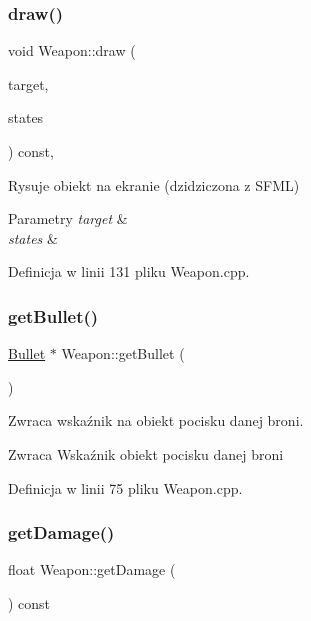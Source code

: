 \subsubsection{\texorpdfstring{draw()}{draw()}}
{\footnotesize\ttfamily void Weapon\+::draw (\begin{DoxyParamCaption}\item[{sf\+::\+Render\+Target \&}]{target,  }\item[{sf\+::\+Render\+States}]{states }\end{DoxyParamCaption}) const\hspace{0.3cm}{\ttfamily [override]}, {\ttfamily [protected]}}



Rysuje obiekt na ekranie (dzidziczona z S\+F\+ML) 


\begin{DoxyParams}{Parametry}
{\em target} & \\
\hline
{\em states} & \\
\hline
\end{DoxyParams}


Definicja w linii 131 pliku Weapon.\+cpp.

\mbox{\label{class_weapon_a9cf68e4a72e5513266ca3e59f48da323}} 
\subsubsection{\texorpdfstring{get\+Bullet()}{getBullet()}}
{\footnotesize\ttfamily \mbox{\hyperlink{class_bullet}{Bullet}} $\ast$ Weapon\+::get\+Bullet (\begin{DoxyParamCaption}{ }\end{DoxyParamCaption})}



Zwraca wskaźnik na obiekt pocisku danej broni. 

\begin{DoxyReturn}{Zwraca}
Wskaźnik obiekt pocisku danej broni 
\end{DoxyReturn}


Definicja w linii 75 pliku Weapon.\+cpp.

\mbox{\label{class_weapon_a35dc33e086bd053d95b10d4a7c83494c}} 
\subsubsection{\texorpdfstring{get\+Damage()}{getDamage()}}
{\footnotesize\ttfamily float Weapon\+::get\+Damage (\begin{DoxyParamCaption}{ }\end{DoxyParamCaption}) const}



